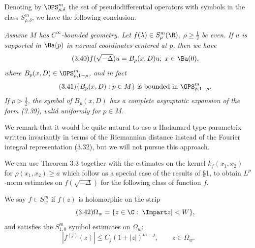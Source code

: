 Denoting by $\OPS^m_{\rho,\delta}$ the set of pseudodifferential operators with symbols in the class $S^m_{\rho,\delta}$, we have the following conclusion.

\begin{theorem}
\label{thm:pdo-representation-of-functional-calculus}

\textit{Assume $M$ has $C^\infty$-bounded geometry. Let $f(\lambda)\in S^m_\rho(\R)$, $\rho \ge \frac12$ be even. If $u$ is supported in $\Ba(p)$ in normal coordinates centered at $p$, then we have}
\begin{equation}\tag{3.40}
f(\sqrt{-\Delta})u=B_p(x,D)u;\ x\in \Ba(0),
\end{equation}
\textit{where $B_p(x,D)\in \OPS^m_{\rho,1-\rho}$, and in fact}
\begin{equation}\tag{3.41}
\{B_p(x,D): p\in M\}\text{ is bounded in }\OPS^m_{\rho,1-\rho}.
\end{equation}
\textit{If $\rho>\frac12$, the symbol of $B_p(x,D)$ has a complete asymptotic expansion of the form (3.39), valid uniformly for $p\in M$.}
\end{theorem}

We remark that it would be quite natural to use a Hadamard type parametrix written invariantly in terms of the Riemannian distance instead of the Fourier integral representation (3.32), but we will not pursue this approach.

We can use Theorem 3.3 together with the estimates on the kernel $k_f(x_1,x_2)$ for $\rho(x_1,x_2)\ge a$ which follow as a special case of the results of \S1, to obtain $L^p$-norm estimates on $f(\sqrt{-\Delta})$ for the following class of function $f$.

\begin{definition}
\label{def:holomorphic-strip-symbol-class}

We say $f\in S_w^m$ if $f(z)$ is holomorphic on the strip
\begin{equation}\tag{3.42}
\Omega_w=\{z\in \C : |\Impart z|<W\},
\end{equation}
and satisfies the $S^m_{1,0}$ symbol estimates on $\Omega_w$:
\begin{equation}\tag{3.43}
|f^{(j)}(z)|\le C_j(1+|z|)^{m-j},\qquad z\in \Omega_w.
\end{equation}
\end{definition}

